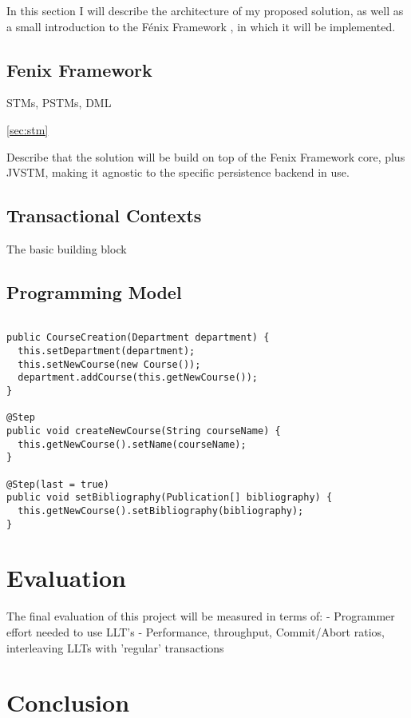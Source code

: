 \documentclass{llncs}
\begin{document}
In this section I will describe the architecture of my proposed
solution, as well as a small introduction to the Fénix Framework
\cite{fernandes2011strict}, in which it will be implemented.

\subsection{Fenix Framework}

STMs, PSTMs, DML

\ref{sec:stm}

Describe that the solution will be build on top of the Fenix Framework
core, plus JVSTM, making it agnostic to the specific persistence
backend in use. 

\subsection{Transactional Contexts}

The basic building block 

\subsection{Programming Model}

\begin{lstlisting}

public CourseCreation(Department department) {
  this.setDepartment(department);
  this.setNewCourse(new Course());
  department.addCourse(this.getNewCourse());
}

@Step
public void createNewCourse(String courseName) {
  this.getNewCourse().setName(courseName);
}

@Step(last = true)
public void setBibliography(Publication[] bibliography) {
  this.getNewCourse().setBibliography(bibliography);
}
\end{lstlisting}

\section{Evaluation}

The final evaluation of this project will be measured in terms of:
- Programmer effort needed to use LLT's
- Performance, throughput, Commit/Abort ratios, interleaving LLTs with
'regular' transactions

\section{Conclusion}



\end{document}
